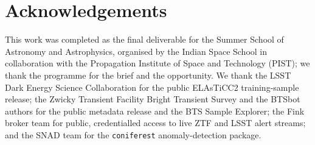 \chapter*{Acknowledgements}

This work was completed as the final deliverable for the Summer School of
Astronomy and Astrophysics, organised by the Indian Space School in
collaboration with the Propagation Institute of Space and Technology
(PIST); we thank the programme for the brief and the opportunity. We thank
the LSST Dark Energy Science Collaboration for the public ELAsTiCC2
training-sample release; the Zwicky Transient Facility Bright Transient
Survey and the BTSbot authors for the public metadata release and the BTS
Sample Explorer; the Fink broker team for public, credentialled access to
live ZTF and LSST alert streams; and the SNAD team for the
\texttt{coniferest} anomaly-detection package.
